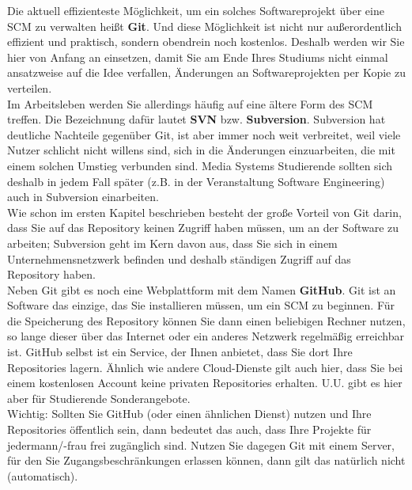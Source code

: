 Die aktuell effizienteste Möglichkeit, um ein solches Softwareprojekt über eine SCM zu verwalten heißt \textbf{Git}. Und diese Möglichkeit ist nicht nur außerordentlich effizient und praktisch, sondern obendrein noch kostenlos. Deshalb werden wir Sie hier von Anfang an einsetzen, damit Sie am Ende Ihres Studiums nicht einmal ansatzweise auf die Idee verfallen, Änderungen an Softwareprojekten per Kopie zu verteilen.\\

Im Arbeitsleben werden Sie allerdings häufig auf eine ältere Form des SCM treffen. Die Bezeichnung dafür lautet \textbf{SVN} bzw. \textbf{Subversion}. Subversion hat deutliche Nachteile gegenüber Git, ist aber immer noch weit verbreitet, weil viele Nutzer schlicht nicht willens sind, sich in die Änderungen einzuarbeiten, die mit einem solchen Umstieg verbunden sind. Media Systems Studierende sollten sich deshalb in jedem Fall später (z.B. in der Veranstaltung Software Engineering) auch in Subversion einarbeiten.\\

Wie schon im ersten Kapitel beschrieben besteht der große Vorteil von Git darin, dass Sie auf das Repository keinen Zugriff haben müssen, um an der Software zu arbeiten; Subversion geht im Kern davon aus, dass Sie sich in einem Unternehmensnetzwerk befinden und deshalb ständigen Zugriff auf das Repository haben.\\

Neben Git gibt es noch eine Webplattform mit dem Namen \textbf{GitHub}. Git ist an Software das einzige, das Sie installieren müssen, um ein SCM zu beginnen. Für die Speicherung des Repository können Sie dann einen beliebigen Rechner nutzen, so lange dieser über das Internet oder ein anderes Netzwerk regelmäßig erreichbar ist. GitHub selbst ist ein Service, der Ihnen anbietet, dass Sie dort Ihre Repositories lagern. Ähnlich wie andere Cloud-Dienste gilt auch hier, dass Sie bei einem kostenlosen Account keine privaten Repositories erhalten. U.U. gibt es hier aber für Studierende Sonderangebote.\\

Wichtig: Sollten Sie GitHub (oder einen ähnlichen Dienst) nutzen und Ihre Repositories öffentlich sein, dann bedeutet das auch, dass Ihre Projekte für jedermann/-frau frei zugänglich sind. Nutzen Sie dagegen Git mit einem Server, für den Sie Zugangsbeschränkungen erlassen können, dann gilt das natürlich nicht (automatisch).\\

